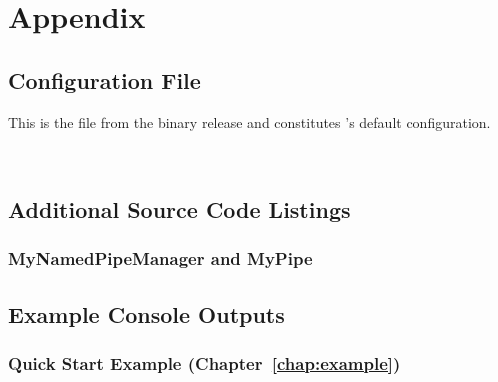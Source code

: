 % 


\appendix
\renewcommand{\thesection}{\Alph{section}} \setcounter{section}{0}
\chapter*{Appendix}
  \section{\KiekerMonitoringPart{} Configuration File}\label{sec:appdx:monitoringproperties}

This is the file \file{\monitoringPropertiesFile} from the binary release and 
constitutes \KiekerMonitoringPart{}'s default configuration.

\

\setXMLListing


\newpage


  \section{Additional Source Code Listings}
    \subsection{MyNamedPipeManager and MyPipe}\label{appendix:pipeListings}
      \setJavaCodeListing
      
\newpage
      \setJavaCodeListing
      

\newpage
  \section{Example Console Outputs}

	\subsection{Quick Start Example (Chapter~\ref{chap:example})}\label{sec:appendix:manualInstrumentation:output}
		
\newpage
		
\newpage	

